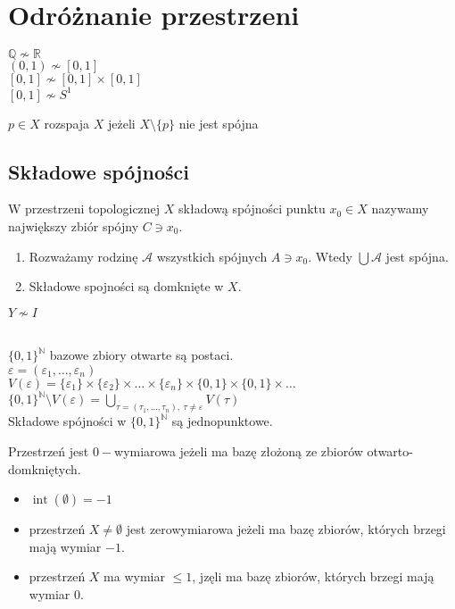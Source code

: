 \section{Odróżnanie przestrzeni} 
$\mathbb{Q} \nsim \mathbb{R}$ \\ 
$(0,1) \nsim [0,1]$ \\ 
$[0,1] \nsim [0,1] \times [0,1]$ \\ 
$[0,1] \nsim S^1$ 
\begin{df} 
    $p \in X$ rozspaja $X$ jeżeli $X \setminus \{p\}$ nie jest spójna 
\end{df} 
\subsection{Składowe spójności} 
\begin{df} 
    W przestrzeni topologicznej $X$ składową spójności punktu $x_0 \in X$ nazywamy 
    największy zbiór spójny $C \ni x_0$.
\end{df} 
\begin{uw} \hfill 
    \begin{enumerate}[(1)]
        \item Rozważamy rodzinę $\mathcal A$ wszystkich spójnych $A \ni x_0$. 
        Wtedy $\bigcup \mathcal A$ jest spójna.
        \item Składowe spojności są domknięte w $X$. 
    \end{enumerate}
\end{uw} 
\begin{prz} 
    $Y \nsim I$ 
\end{prz} 
\begin{prz} ~\\ 
    $\{0,1\}^\mathbb N$ bazowe zbiory otwarte są postaci. \\ 
    $\varepsilon = (\varepsilon_1,\ldots,\varepsilon_n)$ \\ 
    $V(\varepsilon) = \{\varepsilon_1\} \times \{\varepsilon_2\} \times \ldots \times 
    \{\varepsilon_n\} \times \{0,1\} \times \{0,1\} \times \ldots$ \\ 
    $\{0,1\}^\mathbb N \setminus V(\varepsilon) = \bigcup\limits_{\tau = 
    (\tau_1,\ldots,\tau_n),\ \tau \neq \varepsilon} V(\tau)$ \\ 
    Składowe spójności w $\{0,1\}^\mathbb N$ są jednopunktowe.
\end{prz} 
\begin{df} 
    Przestrzeń jest $0-$wymiarowa jeżeli ma bazę złożoną ze zbiorów otwarto-domkniętych. 
    \begin{itemize} 
        \item $\operatorname{int}(\emptyset) = -1$ 
        \item przestrzeń $X \neq \emptyset$ jest zerowymiarowa jeżeli ma bazę zbiorów, 
            których brzegi mają wymiar $-1$. 
        \item przestrzeń $X$ ma wymiar $\le 1$, jzęli ma bazę zbiorów, których brzegi mają
            wymiar 0.
    \end{itemize} 
\end{df} 
